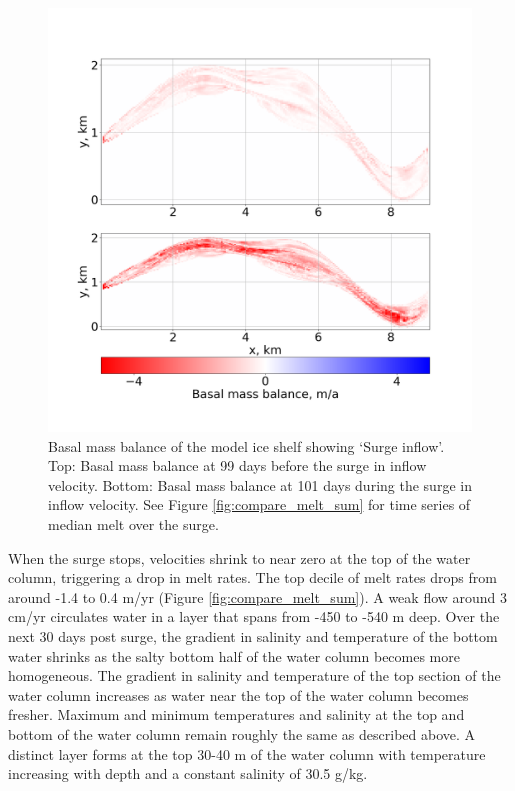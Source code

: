 \begin{figure}[!ht]
\centering
\includegraphics[width=1\textwidth]{chapters/4/surge_melt.png}
\caption[Surge inflow (melt)]{Basal mass balance of the model ice shelf showing `Surge inflow'. Top: Basal mass balance at 99 days before the surge in inflow velocity. Bottom: Basal mass balance at 101 days during the surge in inflow velocity. See Figure \ref{fig:compare_melt_sum} for time series of median melt over the surge.}
\label{fig:surge_melt}
\end{figure}

When the surge stops, velocities shrink to near zero at the top of the water column, triggering a drop in melt rates. The top decile of melt rates drops from around -1.4 to 0.4 m/yr (Figure \ref{fig:compare_melt_sum}). A weak flow around 3 cm/yr circulates water in a layer that spans from -450 to -540 m deep. Over the next 30 days post surge, the gradient in salinity and temperature of the bottom water shrinks as the salty bottom half of the water column becomes more homogeneous. The gradient in salinity and temperature of the top section of the water column increases as water near the top of the water column becomes fresher. Maximum and minimum temperatures and salinity at the top and bottom of the water column remain roughly the same as described above. A distinct layer forms at the top 30-40 m of the water column with temperature increasing with depth and a constant salinity of 30.5 g/kg. 


